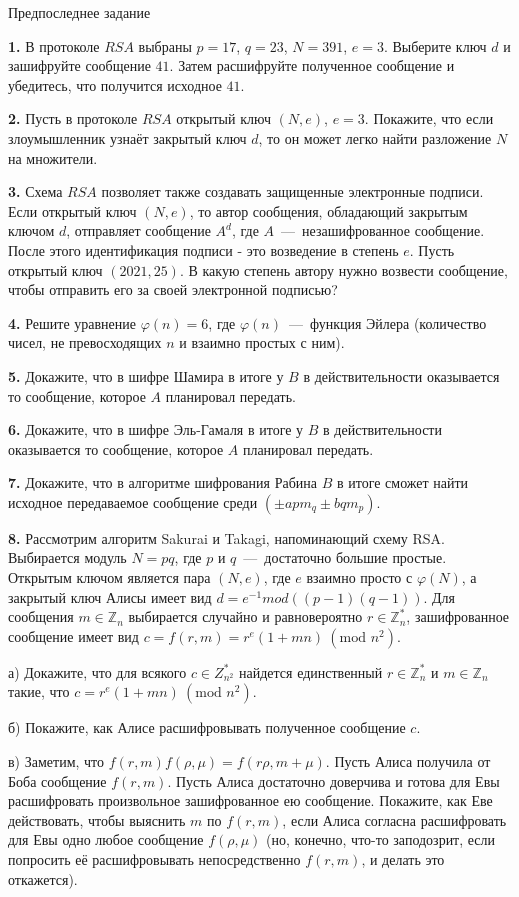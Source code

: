 \documentclass[12pt,a5paper,fleqn]{article}
\begin{document}
\begin{center}
{ \Large Предпоследнее задание}

\end{center}

{\bf 1.} В протоколе $RSA$ выбраны $p = 17$, $q = 23$, $N=391$, $e=3$. Выберите ключ $d$ и зашифруйте сообщение $41$. Затем расшифруйте полученное сообщение и убедитесь, что получится исходное $41$.

\medskip

{\bf 2.} Пусть в протоколе $RSA$ открытый ключ $(N, e)$, $e=3$. Покажите, что если злоумышленник узнаёт закрытый ключ $d$, то он может легко найти разложение $N$ на множители.

\medskip

{\bf 3.} Схема $RSA$ позволяет также создавать защищенные электронные подписи. Если открытый ключ $(N, e)$, то автор сообщения, обладающий закрытым ключом $d$, отправляет сообщение $A^d$, где $A$~---~незашифрованное сообщение. После этого идентификация подписи - это возведение в степень $e$. Пусть открытый ключ $(2021, 25)$. В какую степень автору нужно возвести сообщение, чтобы отправить его за своей электронной подписью?

{\bf 4.} Решите уравнение $\varphi(n) = 6$, где $\varphi(n)$~---~функция Эйлера (количество чисел, не превосходящих $n$ и взаимно простых с ним).

{\bf 5.} Докажите, что в шифре Шамира в итоге у $B$ в действительности оказывается то сообщение, которое $A$ планировал передать.

{\bf 6.} Докажите, что в шифре Эль-Гамаля в итоге у $B$ в действительности оказывается то сообщение, которое $A$ планировал передать.

{\bf 7.} Докажите, что в алгоритме шифрования Рабина $B$ в итоге сможет найти исходное передаваемое сообщение среди $(\pm apm_q \pm bqm_p)$.

{\bf 8.} Рассмотрим алгоритм Sakurai и Takagi, напоминающий схему RSA. Выбирается модуль $N = pq$, где $p$ и $q$~---~достаточно большие простые. Открытым ключом является пара $(N, e)$, где $e$ взаимно просто с $\varphi(N)$, а закрытый ключ Алисы имеет вид $d = e^{-1} mod((p-1)(q-1))$. Для сообщения $m \in \mathbb{Z}_n$ выбирается случайно и равновероятно $r \in \mathbb{Z}_n^*$, зашифрованное сообщение имеет вид $c = f(r, m) = r^e(1+mn) \ (\mbox{mod } n^2)$. 

а) Докажите, что для всякого $c \in Z_{n^2}^*$ найдется единственный $r \in \mathbb{Z}_n^*$ и $m \in \mathbb{Z}_n$ такие, что $c = r^e(1+mn)  \ (\mbox{mod } n^2)$. 

б) Покажите, как Алисе расшифровывать полученное сообщение $c$.

в) Заметим, что $f(r, m) f(\rho, \mu) = f(r\rho, m+\mu)$. Пусть Алиса получила от Боба сообщение $f(r, m)$. Пусть Алиса достаточно доверчива и готова для Евы расшифровать произвольное зашифрованное ею сообщение. Покажите, как Еве действовать, чтобы выяснить $m$ по $f(r, m)$, если Алиса согласна расшифровать для Евы одно любое сообщение $f(\rho, \mu)$ (но, конечно, что-то заподозрит, если попросить её расшифровывать непосредственно $f(r, m)$, и делать это откажется).
\end{document}
